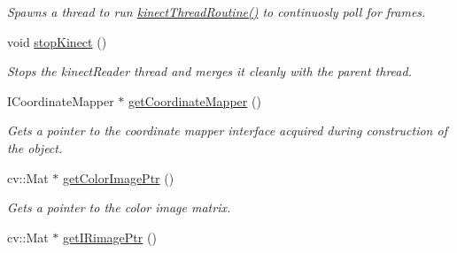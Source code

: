 \begin{DoxyCompactItemize}
\begin{DoxyCompactList}\small\item\em Spawns a thread to run \hyperlink{classpersonal_robotics_1_1_kinect_reader_a9263a03547aa8f9d401d3e2ad34f5e4f}{kinect\+Thread\+Routine()} to continuosly poll for frames. \end{DoxyCompactList}\item 
\hypertarget{classpersonal_robotics_1_1_kinect_reader_a40ee858f5274108e8b9ad4a13c14cbd2}{}void \hyperlink{classpersonal_robotics_1_1_kinect_reader_a40ee858f5274108e8b9ad4a13c14cbd2}{stop\+Kinect} ()\label{classpersonal_robotics_1_1_kinect_reader_a40ee858f5274108e8b9ad4a13c14cbd2}

\begin{DoxyCompactList}\small\item\em Stops the kinect\+Reader thread and merges it cleanly with the parent thread. \end{DoxyCompactList}\item 
\hypertarget{classpersonal_robotics_1_1_kinect_reader_a03ac1f0fd33411971f34249be1495edb}{}I\+Coordinate\+Mapper $\ast$ \hyperlink{classpersonal_robotics_1_1_kinect_reader_a03ac1f0fd33411971f34249be1495edb}{get\+Coordinate\+Mapper} ()\label{classpersonal_robotics_1_1_kinect_reader_a03ac1f0fd33411971f34249be1495edb}

\begin{DoxyCompactList}\small\item\em Gets a pointer to the coordinate mapper interface acquired during construction of the object. \end{DoxyCompactList}\item 
\hypertarget{classpersonal_robotics_1_1_kinect_reader_afb46f664c9181b8ceb9abdb46afe0482}{}cv\+::\+Mat $\ast$ \hyperlink{classpersonal_robotics_1_1_kinect_reader_afb46f664c9181b8ceb9abdb46afe0482}{get\+Color\+Image\+Ptr} ()\label{classpersonal_robotics_1_1_kinect_reader_afb46f664c9181b8ceb9abdb46afe0482}

\begin{DoxyCompactList}\small\item\em Gets a pointer to the color image matrix. \end{DoxyCompactList}\item 
\hypertarget{classpersonal_robotics_1_1_kinect_reader_aee0181e76408bc5f9a2771dea5890447}{}cv\+::\+Mat $\ast$ \hyperlink{classpersonal_robotics_1_1_kinect_reader_aee0181e76408bc5f9a2771dea5890447}{get\+I\+Rimage\+Ptr} ()\label{classpersonal_robotics_1_1_kinect_reader_aee0181e76408bc5f9a2771dea5890447}


\end{DoxyCompactItemize}
